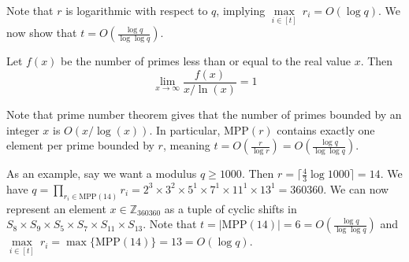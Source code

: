 Note that $r$ is logarithmic with respect to $q$, implying $\underset{i \in [t]}{\max} \ r_i = O(\log q)$.
We now show that $t = O(\frac{\log q}{\log \log q})$.

\begin{theorem}
    Let $f(x)$ be the number of primes less than or equal to the real value $x$. Then
    \begin{equation*}
        \lim_{x \to \infty} \frac{f(x)}{x/\ln(x)} = 1
    \end{equation*}
\end{theorem}
Note that prime number theorem gives that the number of primes bounded by an integer $x$ is $O(x/\log(x))$. In particular, $\text{MPP}(r)$ contains exactly one element per prime bounded by $r$, meaning $t = O(\frac{r}{\log r}) = O(\frac{\log q}{\log \log q})$.

As an example, say we want a modulus $q \geq 1000$. Then $r = \lceil \frac{4}{3} \log 1000 \rceil = 14$. We have $q = \underset{r_i \in \text{MPP}(14)}{\prod} r_i = 2^3 \times 3^2 \times 5^1 \times 7^1 \times 11^1 \times 13^1 = 360360$. We can now represent an element $x \in \mathbb{Z}_{360360}$ as a tuple of cyclic shifts in $S_8 \times S_9 \times S_5 \times S_7 \times S_{11} \times S_{13}$. Note that $t = |\text{MPP}(14)| = 6 = O(\frac{\log q}{\log \log q})$ and $\underset{i \in [t]}{\max} \ r_i = \max\{\text{MPP}(14)\} = 13 = O(\log q)$.